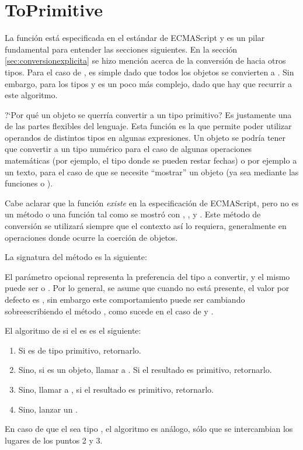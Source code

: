 \section{ToPrimitive}
\label{sec:toprimitive}

La función  está especificada en el estándar de ECMAScript \cite{EcmaScript:15} y es un pilar fundamental para entender las secciones siguientes. En la sección \ref{sec:conversionexplicita} se hizo mención acerca de la conversión de  hacia otros tipos. Para el caso de , es simple dado que todos los objetos se convierten a . Sin embargo, para los tipos  y  es un poco más complejo, dado que hay que recurrir a este algoritmo. 

?`Por qué un objeto se querría convertir a un tipo primitivo? Es justamente una de las partes flexibles del lenguaje. Esta función es la que permite poder utilizar operandos de distintos tipos en algunas expresiones. Un objeto se podría tener que convertir a un tipo numérico para el caso de algunas operaciones matemáticas (por ejemplo, el tipo  donde se pueden restar fechas) o por ejemplo a un texto, para el caso de que se necesite "`mostrar"' un objeto (ya sea mediante las funciones  o ).

Cabe aclarar que la función  \textit{existe} en la especificación de ECMAScript, pero no es un método o una función tal como se mostró con , ,  y . Este método de conversión se utilizará siempre que el contexto así lo requiera, generalmente en operaciones donde ocurre la coerción de objetos.

La signatura del método es la siguiente: 

El parámetro opcional  representa la preferencia del tipo a convertir, y el mismo puede ser  o . Por lo general, se asume que cuando no está presente, el valor por defecto es , sin embargo este comportamiento puede ser cambiando sobreescribiendo el método , como sucede en el caso de  y .

El algoritmo de  si el  es  es el siguiente:

\begin{enumerate}
\item Si  es de tipo primitivo, retornarlo.
\item Sino, si  es un objeto, llamar a . Si el resultado es primitivo, retornarlo.
\item Sino, llamar a , si el resultado es primitivo, retornarlo.
\item Sino, lanzar un .
\end{enumerate}

En caso de que el  sea tipo , el algoritmo es análogo, sólo que se intercambian los lugares de los puntos 2 y 3.
